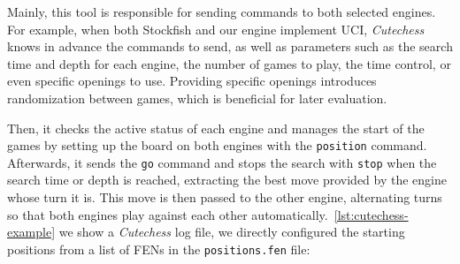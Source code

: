 \vspace{1em}

\noindent Mainly, this tool is responsible for sending commands to both selected engines. For example, when both Stockfish and our engine implement UCI, \textit{Cutechess} knows in advance the commands to send, as well as parameters such as the search time and depth for each engine, the number of games to play, the time control, or even specific openings to use. Providing specific openings introduces randomization between games, which is beneficial for later evaluation.

\vspace{1em}

\noindent Then, it checks the active status of each engine and manages the start of the games by setting up the board on both engines with the \texttt{position} command. Afterwards, it sends the \texttt{go} command and stops the search with \texttt{stop} when the search time or depth is reached, extracting the best move provided by the engine whose turn it is. This move is then passed to the other engine, alternating turns so that both engines play against each other automatically.~\cref{lst:cutechess-example} we show a \textit{Cutechess} log file, we directly configured the starting positions from a list of FENs in the \texttt{positions.fen} file:

